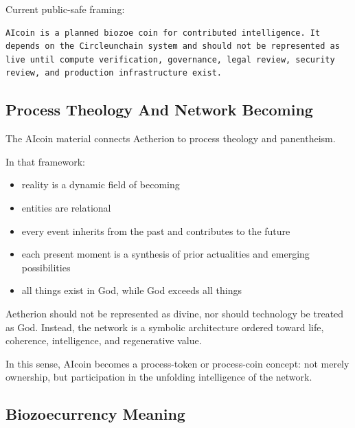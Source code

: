 ﻿\documentclass[12pt]{article}
\begin{document}
Current public-safe framing:

\begin{verbatim}
AIcoin is a planned biozoe coin for contributed intelligence. It depends on the Circleunchain system and should not be represented as live until compute verification, governance, legal review, security review, and production infrastructure exist.
\end{verbatim}

\subsection{Process Theology And Network Becoming}


The AIcoin material connects Aetherion to process theology and panentheism.

In that framework:

\begin{itemize}
  \item reality is a dynamic field of becoming
\end{itemize}
\begin{itemize}
  \item entities are relational
\end{itemize}
\begin{itemize}
  \item every event inherits from the past and contributes to the future
\end{itemize}
\begin{itemize}
  \item each present moment is a synthesis of prior actualities and emerging possibilities
\end{itemize}
\begin{itemize}
  \item all things exist in God, while God exceeds all things
\end{itemize}

Aetherion should not be represented as divine, nor should technology be treated as God. Instead, the network is a symbolic architecture ordered toward life, coherence, intelligence, and regenerative value.

In this sense, AIcoin becomes a process-token or process-coin concept: not merely ownership, but participation in the unfolding intelligence of the network.

\subsection{Biozoecurrency Meaning}
\end{document}
